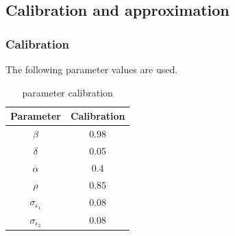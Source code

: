 \documentclass[a4paper,12pt]{scrartcl} %
\begin{document}
\subsection{Calibration and approximation}
\subsubsection{Calibration}

The following parameter values are used.

\begin{table}[h]
\centering\caption{parameter calibration}\label{5}
\begin{tabular}{cc}
  \hline
  Parameter&Calibration\\
  \hline
  $\beta$&0.98\\
  $\delta$&0.05\\
  $\alpha$&0.4\\
  $\rho$&0.85\\
  $\sigma_{\epsilon_1}$&0.08\\
  $\sigma_{\epsilon_2}$&0.08\\
  \hline
  \end{tabular}
\end{table}
\end{document}
